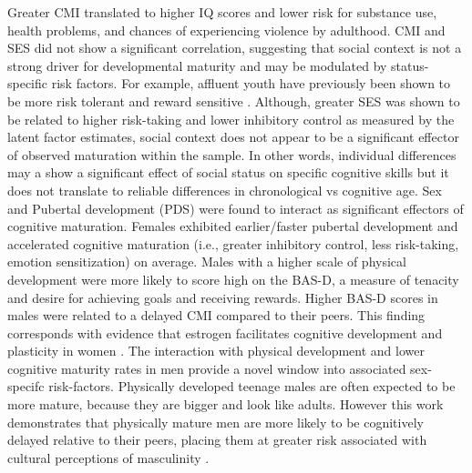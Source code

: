 \documentclass{article}%
\begin{document}
Greater CMI translated to higher IQ scores and lower risk for substance use, health problems, and chances of experiencing violence by adulthood. CMI and SES did not show a significant correlation, suggesting that social context is not a strong driver for developmental maturity and may be modulated by status-specific risk factors. For example, affluent youth have previously been shown to be more risk tolerant and reward sensitive \citep{luthar2002privileged, luthar2003culture}. Although, greater SES was shown to be related to higher risk-taking and lower inhibitory control as measured by the latent factor estimates, social context does not appear to be a significant effector of observed maturation within the sample. In other words, individual differences may a show a significant effect of social status on specific cognitive skills but it does not translate to reliable differences in chronological vs cognitive age. Sex and Pubertal development (PDS) were found to interact as significant effectors of cognitive maturation. Females exhibited earlier/faster pubertal development and accelerated cognitive maturation (i.e., greater inhibitory control, less risk-taking, emotion sensitization) on average. Males with a higher scale of physical development were more likely to score high on the BAS-D, a measure of tenacity and desire for achieving goals and receiving rewards. Higher BAS-D scores in males were related to a delayed CMI compared to their peers. This finding corresponds with evidence that estrogen facilitates cognitive development and plasticity in women \citep{hara2015estrogen}. The interaction with physical development and lower cognitive maturity rates in men provide a novel window into associated sex-specifc risk-factors. Physically developed teenage males are often expected to be more mature, because they are bigger and look like adults. However this work demonstrates that physically mature men are more likely to be cognitively delayed relative to their peers, placing them at greater risk associated with cultural perceptions of masculinity \citep{chu2005adolescent}.


\vspace{2pt}
\end{document}
